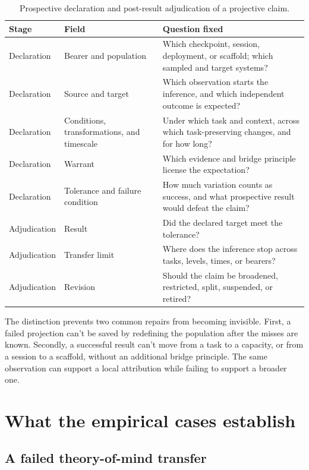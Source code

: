\documentclass[12pt]{article}
\begin{document}
\begin{table}[ht]
\centering
\small
\begin{tabular}{>{\raggedright\arraybackslash}p{.16\linewidth}>{\raggedright\arraybackslash}p{.25\linewidth}>{\raggedright\arraybackslash}p{.45\linewidth}}
\toprule
Stage & Field & Question fixed \\
\midrule
Declaration & Bearer and population & Which checkpoint, session, deployment, or scaffold; which sampled and target systems? \\
Declaration & Source and target & Which observation starts the inference, and which independent outcome is expected? \\
Declaration & Conditions, transformations, and timescale & Under which task and context, across which task-preserving changes, and for how long? \\
Declaration & Warrant & Which evidence and bridge principle license the expectation? \\
Declaration & Tolerance and failure condition & How much variation counts as success, and what prospective result would defeat the claim? \\
\midrule
Adjudication & Result & Did the declared target meet the tolerance? \\
Adjudication & Transfer limit & Where does the inference stop across tasks, levels, times, or bearers? \\
Adjudication & Revision & Should the claim be broadened, restricted, split, suspended, or retired? \\
\bottomrule
\end{tabular}
\caption{Prospective declaration and post-result adjudication of a projective claim.}
\label{tab:projections}
\end{table}

The distinction prevents two common repairs from becoming invisible. First, a failed projection can't be saved by redefining the population after the misses are known. Secondly, a successful result can't move from a task to a capacity, or from a session to a scaffold, without an additional bridge principle. The same observation can support a local attribution while failing to support a broader one.

\section{What the empirical cases establish}

\subsection{A failed theory-of-mind transfer}
\end{document}
